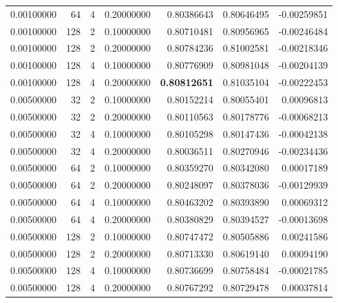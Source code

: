 \begin{table}[htbp]
{\begin{tabular}{rrrrrrr}
0.00100000 & 64 & 4 & 0.20000000 & 0.80386643 & 0.80646495 & -0.00259851 \\
0.00100000 & 128 & 2 & 0.10000000 & 0.80710481 & 0.80956965 & -0.00246484 \\
0.00100000 & 128 & 2 & 0.20000000 & 0.80784236 & 0.81002581 & -0.00218346 \\
0.00100000 & 128 & 4 & 0.10000000 & 0.80776909 & 0.80981048 & -0.00204139 \\
0.00100000 & 128 & 4 & 0.20000000 & \textbf{0.80812651} & 0.81035104 & -0.00222453 \\
0.00500000 & 32 & 2 & 0.10000000 & 0.80152214 & 0.80055401 & 0.00096813 \\
0.00500000 & 32 & 2 & 0.20000000 & 0.80110563 & 0.80178776 & -0.00068213 \\
0.00500000 & 32 & 4 & 0.10000000 & 0.80105298 & 0.80147436 & -0.00042138 \\
0.00500000 & 32 & 4 & 0.20000000 & 0.80036511 & 0.80270946 & -0.00234436 \\
0.00500000 & 64 & 2 & 0.10000000 & 0.80359270 & 0.80342080 & 0.00017189 \\
0.00500000 & 64 & 2 & 0.20000000 & 0.80248097 & 0.80378036 & -0.00129939 \\
0.00500000 & 64 & 4 & 0.10000000 & 0.80463202 & 0.80393890 & 0.00069312 \\
0.00500000 & 64 & 4 & 0.20000000 & 0.80380829 & 0.80394527 & -0.00013698 \\
0.00500000 & 128 & 2 & 0.10000000 & 0.80747472 & 0.80505886 & 0.00241586 \\
0.00500000 & 128 & 2 & 0.20000000 & 0.80713330 & 0.80619140 & 0.00094190 \\
0.00500000 & 128 & 4 & 0.10000000 & 0.80736699 & 0.80758484 & -0.00021785 \\
0.00500000 & 128 & 4 & 0.20000000 & 0.80767292 & 0.80729478 & 0.00037814 \\
\hline
\end{tabular}
}
\end{table}
